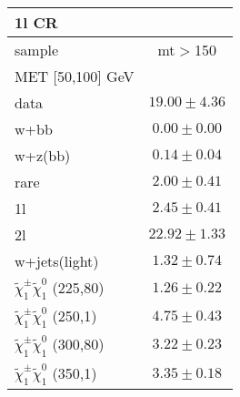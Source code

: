 \begin{table}
\begin{center}
\small
\begin{tabular}{lc}
\hline
1l CR & \\
\hline
sample&mt$>$150\\
\hline
MET [50,100] GeV &  \\
\hline
data&$19.00\pm4.36$\\
\hline
w+bb&$0.00\pm0.00$\\
w+z(bb)&$0.14\pm0.04$\\
rare&$2.00\pm0.41$\\
1l&$2.45\pm0.41$\\
2l&$22.92\pm1.33$\\
w+jets(light)&$1.32\pm0.74$\\
$\tilde{\chi}_{1}^{\pm}\tilde{\chi}_{1}^{0}$ (225,80)&$1.26\pm0.22$\\
$\tilde{\chi}_{1}^{\pm}\tilde{\chi}_{1}^{0}$ (250,1)&$4.75\pm0.43$\\
$\tilde{\chi}_{1}^{\pm}\tilde{\chi}_{1}^{0}$ (300,80)&$3.22\pm0.23$\\
$\tilde{\chi}_{1}^{\pm}\tilde{\chi}_{1}^{0}$ (350,1)&$3.35\pm0.18$\\
\hline
\hline\hline
\hline
\end{tabular}
\end{center}
\end{table}
